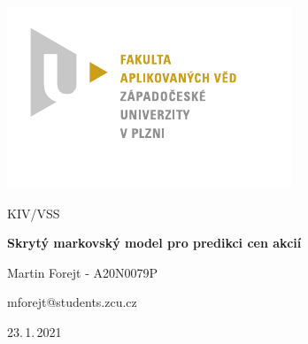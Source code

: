 \documentclass[
    12pt,
    a4paper,
    czech,
    titlepage
]{article}
\begin{document}
    \begin{titlepage}
        \vspace*{-2cm}
        {\centering\includegraphics[scale=1.0]{img/logo_FAV}\par}
        \centering
        \vspace*{3cm}
        {\Large KIV/VSS \par}
        \vspace{1.5cm}
        {\Huge\bfseries Skrytý markovský model pro predikci cen akcií \par}
        \vspace{2cm}

        {\large Martin Forejt - A20N0079P \par}
        {\large mforejt@students.zcu.cz \par}
        \vspace{1cm}

        \vfill

        {\Large 23.\,1.\,2021}
    \end{titlepage}

    \tableofcontents
    \clearpage

    
    
    
    
    
    
    
    
    
    
\end{document}
